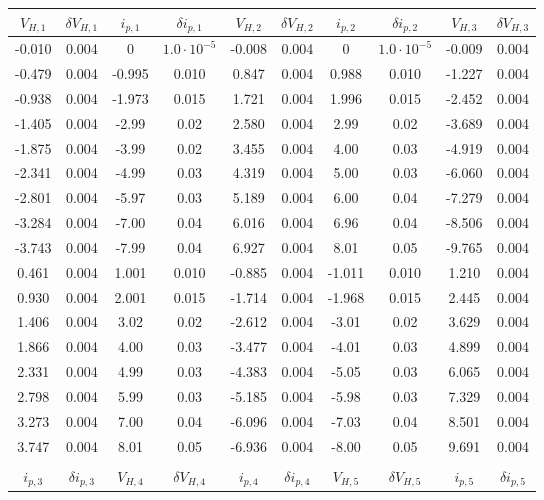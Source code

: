 \begin{table}
\centering \tiny
\begin{tabular}{cccccccccc}
$V_{H,1}$ & $\delta V_{H,1}$ & $i_{p,1}$ & $\delta i_{p,1}$ & $V_{H,2}$ & $\delta V_{H,2}$ & $i_{p,2}$ & $\delta i_{p,2}$ & $V_{H,3}$ & $\delta V_{H,3}$ \\
\hline
-0.010 & 0.004 & 0 & $1.0 \cdot 10^{-5}$ & -0.008 & 0.004 & 0 & $1.0 \cdot 10^{-5}$ & -0.009 & 0.004\\
-0.479 & 0.004 & -0.995 & 0.010 & 0.847 & 0.004 & 0.988 & 0.010 & -1.227 & 0.004\\
-0.938 & 0.004 & -1.973 & 0.015 & 1.721 & 0.004 & 1.996 & 0.015 & -2.452 & 0.004\\
-1.405 & 0.004 & -2.99 & 0.02 & 2.580 & 0.004 & 2.99 & 0.02 & -3.689 & 0.004\\
-1.875 & 0.004 & -3.99 & 0.02 & 3.455 & 0.004 & 4.00 & 0.03 & -4.919 & 0.004\\
-2.341 & 0.004 & -4.99 & 0.03 & 4.319 & 0.004 & 5.00 & 0.03 & -6.060 & 0.004\\
-2.801 & 0.004 & -5.97 & 0.03 & 5.189 & 0.004 & 6.00 & 0.04 & -7.279 & 0.004\\
-3.284 & 0.004 & -7.00 & 0.04 & 6.016 & 0.004 & 6.96 & 0.04 & -8.506 & 0.004\\
-3.743 & 0.004 & -7.99 & 0.04 & 6.927 & 0.004 & 8.01 & 0.05 & -9.765 & 0.004\\
0.461 & 0.004 & 1.001 & 0.010 & -0.885 & 0.004 & -1.011 & 0.010 & 1.210 & 0.004\\
0.930 & 0.004 & 2.001 & 0.015 & -1.714 & 0.004 & -1.968 & 0.015 & 2.445 & 0.004\\
1.406 & 0.004 & 3.02 & 0.02 & -2.612 & 0.004 & -3.01 & 0.02 & 3.629 & 0.004\\
1.866 & 0.004 & 4.00 & 0.03 & -3.477 & 0.004 & -4.01 & 0.03 & 4.899 & 0.004\\
2.331 & 0.004 & 4.99 & 0.03 & -4.383 & 0.004 & -5.05 & 0.03 & 6.065 & 0.004\\
2.798 & 0.004 & 5.99 & 0.03 & -5.185 & 0.004 & -5.98 & 0.03 & 7.329 & 0.004\\
3.273 & 0.004 & 7.00 & 0.04 & -6.096 & 0.004 & -7.03 & 0.04 & 8.501 & 0.004\\
3.747 & 0.004 & 8.01 & 0.05 & -6.936 & 0.004 & -8.00 & 0.05 & 9.691 & 0.004\\
\\
$i_{p,3}$ & $\delta i_{p,3}$ & $V_{H,4}$ & $\delta V_{H,4}$ & $i_{p,4}$ & $\delta i_{p,4}$ & $V_{H,5}$ & $\delta V_{H,5}$ & $i_{p,5}$ & $\delta i_{p,5}$ \\

\end{tabular}
\end{table}
